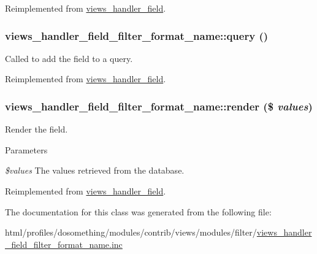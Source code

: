 Reimplemented from \hyperlink{classviews__handler__field_a3d50050864c255b71c842972a45d39f6}{views\_\-handler\_\-field}.\hypertarget{classviews__handler__field__filter__format__name_a3032499c14945a87535f1fdfbea57feb}{
\subsubsection[{query}]{\setlength{\rightskip}{0pt plus 5cm}views\_\-handler\_\-field\_\-filter\_\-format\_\-name::query ()}}
\label{classviews__handler__field__filter__format__name_a3032499c14945a87535f1fdfbea57feb}
Called to add the field to a query. 

Reimplemented from \hyperlink{classviews__handler__field_a4f661f91bcbe80d4a00c30a31456c502}{views\_\-handler\_\-field}.\hypertarget{classviews__handler__field__filter__format__name_a1e30b381ab89cb8eb2db40d340de97f6}{
\subsubsection[{render}]{\setlength{\rightskip}{0pt plus 5cm}views\_\-handler\_\-field\_\-filter\_\-format\_\-name::render (\$ {\em values})}}
\label{classviews__handler__field__filter__format__name_a1e30b381ab89cb8eb2db40d340de97f6}
Render the field.


\begin{DoxyParams}{Parameters}
\item[{\em \$values}]The values retrieved from the database. \end{DoxyParams}


Reimplemented from \hyperlink{classviews__handler__field_a82ff951c5e9ceb97b2eab86f880cbc1e}{views\_\-handler\_\-field}.

The documentation for this class was generated from the following file:\begin{DoxyCompactItemize}
\item 
html/profiles/dosomething/modules/contrib/views/modules/filter/\hyperlink{views__handler__field__filter__format__name_8inc}{views\_\-handler\_\-field\_\-filter\_\-format\_\-name.inc}\end{DoxyCompactItemize}
